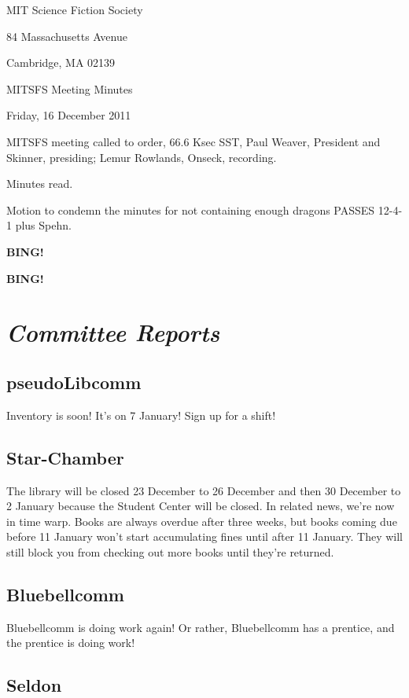 \documentclass[10pt]{article}
\newcommand{\bing}{{\bf BING!} }
\newcommand{\goto}[1]{\bing \vskip 12pt \section*{{\em{#1}}}}
\newcommand{\ps}{ plus Spehn\xspace}
\newcommand{\skinner}{Paul Weaver, President and Skinner}
\newcommand{\onseck}{Lemur Rowlands, Onseck}
\newcommand{\meetingdate}{Friday, 16 December 2011}
\begin{document}
\begin{center}

MIT Science Fiction Society

84 Massachusetts Avenue

Cambridge, MA 02139

\vspace{12pt}

MITSFS Meeting Minutes

\meetingdate

\end{center}

\vspace{18pt}

\setlength{\parskip}{6pt}

\noindent
MITSFS meeting called to order, 66.6 Ksec SST,
\skinner, presiding; \onseck, recording.

Minutes read.

Motion to condemn the minutes for not containing enough dragons PASSES 12-4-1\ps.

\bing

\goto{Committee Reports}

\subsection*{pseudoLibcomm}

Inventory is soon!  It's on 7 January!  Sign up for a shift!

\subsection*{Star-Chamber}

The library will be closed 23 December to 26 December and then 30 December to 2 January 
because the Student Center will be closed.  In related news, we're now in time warp.  Books
are always overdue after three weeks, but books coming due before 11 January won't start
accumulating fines until after 11 January.  They will still block you from checking out more
books until they're returned.

\subsection*{Bluebellcomm}

Bluebellcomm is doing work again!  Or rather, Bluebellcomm has a prentice, and the prentice
is doing work!

\subsection*{Seldon}
\end{document}
